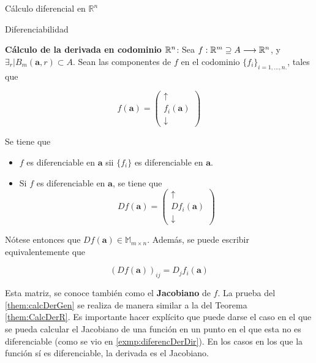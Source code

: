 \begin{chapter}{Cálculo diferencial en $\mathbb{R}^n$}
\begin{section}{Diferenciabilidad}
\begin{them}
\label{them:calcDerGen}
\textbf{Cálculo de la derivada en codominio $\mathbb{R}^n$}: Sea $f: \mathbb{R}^m \supseteq A \longrightarrow \mathbb{R}^n$, y $\exists_r | B_m(\textbf{a},r) \subset A$. Sean las componentes de $f$ en el codominio $\{f_i\}_{i=1,...,n.}$, tales que

\begin{equation*}
    f(\textbf{a}) = \left(\begin{array}{c}
         \uparrow \\
         f_i(\textbf{a}) \\
         \downarrow
    \end{array}\right)
\end{equation*}

Se tiene que

\begin{itemize}
    \item $f$ es diferenciable en $\textbf{a}$ sii $\{f_i\}$ es diferenciable en $\textbf{a}$.
    \item Si $f$ es diferenciable en $\textbf{a}$, se tiene que
    \begin{equation}
        Df(\textbf{a}) = \left( \begin{array}{c}
             \uparrow\\
             Df_i(\textbf{a}) \\
             \downarrow
        \end{array} \right)
    \end{equation}
\end{itemize}

\end{them}

Nótese entonces que $Df(\textbf{a}) \in \mathbb{M}_{m\times n}$. Además, se puede escribir equivalentemente que 

\begin{equation*}
    (Df(\textbf{a}))_{ij} = D_jf_i(\textbf{a})
\end{equation*}

Esta matriz, se conoce también como el \textbf{Jacobiano} de $f$. La prueba del \cref{them:calcDerGen} se realiza de manera similar a la del Teorema \ref{them:CalcDerR}. Es importante hacer explícito que puede darse el caso en el que se pueda calcular el Jacobiano de una función en un punto en el que esta no es diferenciable (como se vio en \cref{exmp:diferencDerDir}). En los casos en los que la función sí es diferenciable, la derivada es el Jacobiano.


\end{section}
\end{chapter}
